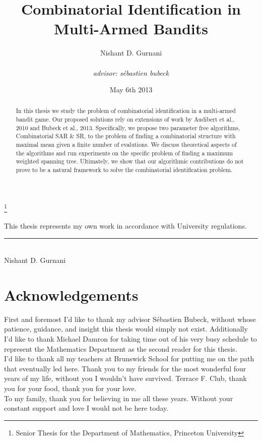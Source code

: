 \documentclass[11.75pt,oneside]{amsart}
\title{Combinatorial Identification in Multi-Armed Bandits}
\author{Nishant D. Gurnani \\ \\ \emph{\lowercase{\MakeUppercase{A}dvisor: \MakeUppercase{S}\'{e}bastien \MakeUppercase{B}ubeck}}}
\date{May 6th 2013}
\newcommand{\skipline}{\vspace{12pt}}
\begin{document}
\begin{abstract}
In this thesis we study the problem of combinatorial identification in a multi-armed bandit game. Our proposed solutions rely on extensions of work by Audibert et al., 2010 and Bubeck et al., 2013. Specifically, we propose two parameter free algorithms, Combinatorial SAR \& SR, to the problem of finding a combinatorial structure with maximal mean given a finite number of evalutions. We discuss theoretical aspects of the algorithms and run experiments on the specific problem of finding a maximum weighted spanning tree. Ultimately, we show that our algorithmic contributions do not prove to be a natural framework to solve the combinatorial identification problem.
\end{abstract}

\thanks{Senior Thesis for the Department of Mathematics, Princeton University}

\maketitle

\vspace{270pt}
This thesis represents my own work in accordance with University regulations.
\skipline
\begin{center}
\rule{2.5in}{1pt}\\
Nishant D. Gurnani\\
\end{center}

\newpage

\section*{Acknowledgements}
First and foremost I'd like to thank my advisor S\'{e}bastien Bubeck, without whose patience, guidance, and insight this thesis would simply not exist. Additionally I'd like to thank Michael Damron for taking time out of his very busy schedule to represent the Mathematics Department as the second reader for this thesis.\\

I'd like to thank all my teachers at Brunswick School for putting me on the path that eventually led here. Thank you to my friends for the most wonderful four years of my life, without you I wouldn't have survived. Terrace F. Club, thank you for your food, thank you for your love.\\

To my family, thank you for believing in me all these years. Without your constant support and love I would not be here today.
\end{document}
